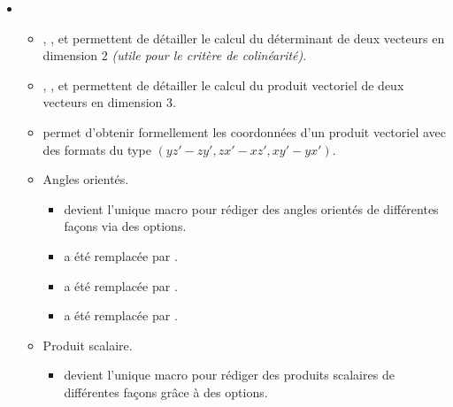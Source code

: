 \begin{itemize}[itemsep=.5em]


    \separation
    \item {}
    \begin{itemize}[itemsep=.5em]
        \item {}, ,  et  permettent de détailler le calcul du déterminant de deux vecteurs en dimension $2$ \emph{(utile pour le critère de colinéarité)}.


        \item {}, ,  et  permettent de détailler le calcul du produit vectoriel de deux vecteurs en dimension $3$.

        \item {} permet d'obtenir formellement les coordonnées d'un produit vectoriel avec des formats du type $(y z' - z y' , z x' - x z ' , x y' - y x')$.


        \item Angles orientés.
        
        \begin{itemize}[itemsep=.5em, label=$\rightarrow$]
            \item {} devient l'unique macro pour rédiger des angles orientés de différentes façons via des options.
            
            \item {}  a été remplacée par .
            
            \item {}  a été remplacée par .
                  
            \item {} a été remplacée par .
	    \end{itemize}


        \item Produit scalaire.
        
        \begin{itemize}[itemsep=.5em, label=$\rightarrow$]
            \item {} devient l'unique macro pour rédiger des produits scalaires de différentes façons grâce à des options.
            

\end{itemize}
\end{itemize}
\end{itemize}
